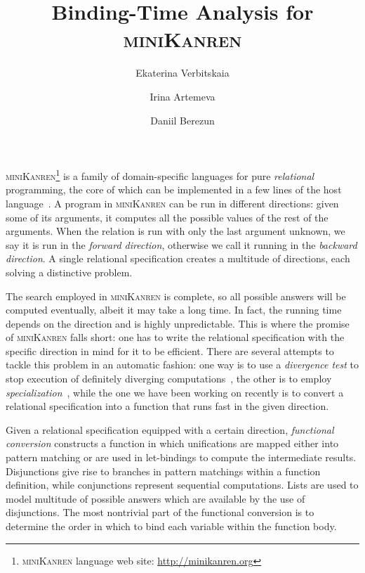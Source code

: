 \documentclass[submission,copyright,creativecommons]{eptcs}
\title{Binding-Time Analysis for \textsc{miniKanren}}
\author{Ekaterina Verbitskaia
\institute{JetBrains Research\\
Saint Petersburg, Russia}
\email{kajigor@gmail.com}
\and
Irina Artemeva
\institute{ITMO University\\
Saint Petersburg, Russia}
\email{irina-pluralia@rambler.ru}
\and
Daniil Berezun
\institute{JetBrains Research\\
Saint Petersburg, Russia}
\email{daniil.berezun@jetbrains.com }
}
\newcommand{\miniKanren}{\textsc{miniKanren}}
\begin{document}
\maketitle


\miniKanren{}\footnote{\miniKanren{} language web site: \url{http://minikanren.org}} is a family of domain-specific languages for pure \emph{relational} programming, the core of which can be implemented in a few lines of the host language~\cite{hemann2013ukanren}.
A program in \miniKanren{} can be run in different directions: given some of its arguments, it computes all the possible values of the rest of the arguments.
When the relation is run with only the last argument unknown, we say it is run in the \emph{forward direction}, otherwise we call it running in the \emph{backward direction}.
A single relational specification creates a multitude of directions, each solving a distinctive problem.

The search employed in \miniKanren{} is complete, so all possible answers will be computed eventually, albeit it may take a long time.
In fact, the running time depends on the direction and is highly unpredictable.
This is where the promise of \miniKanren{} falls short: one has to write the relational specification with the specific direction in mind for it to be efficient.
There are several attempts to tackle this problem in an automatic fashion: one way is to use a \emph{divergence test} to stop execution of definitely diverging computations~\cite{rozplokhas2018improving}, the other is to employ \emph{specialization}~\cite{lozov2019relational}, while the one we have been working on recently is to convert a relational specification into a function that runs fast in the given direction.

Given a relational specification equipped with a certain direction, \emph{functional conversion} constructs a function in which unifications are mapped either into pattern matching or are used in let-bindings to compute the intermediate results.
Disjunctions give rise to branches in pattern matchings within a function definition, while conjunctions represent sequential computations.
Lists are used to model multitude of possible answers which are available by the use of disjunctions.
The most nontrivial part of the functional conversion is to determine the order in which to bind each variable within the function body.
\end{document}
